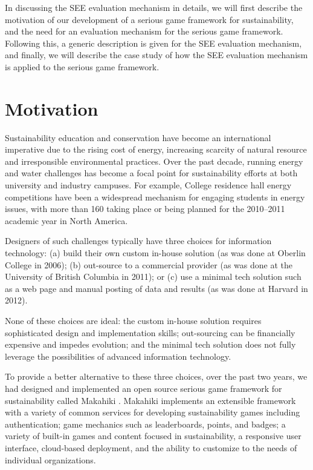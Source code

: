 \documentclass{sigchi}
\begin{document}
In discussing the SEE evaluation mechanism in details, we will first describe the motivation of our development of a serious game framework for sustainability, and the need for an evaluation mechanism for the serious game framework. Following this, a generic description is given for the SEE evaluation mechanism, and finally, we will describe the case study of how the SEE evaluation mechanism is applied to the serious game framework.

\section{Motivation}

Sustainability education and conservation have become an international imperative due to the rising cost of energy, increasing scarcity of natural resource and irresponsible environmental practices. Over the past decade, running energy and water challenges has become a focal point for sustainability efforts at both university and industry campuses. For example, College residence hall energy competitions have been a widespread mechanism for engaging students in energy issues, with more than 160 taking place or being planned for the 2010--2011 academic year in North America\cite{Hodge2010}.

Designers of such challenges typically have three choices for information technology: (a) build their own custom in-house solution (as was done at Oberlin College in 2006\cite{petersen-dorm-energy-reduction}); (b) out-source to a commercial provider (as was done at the University of British Columbia in 2011); or (c) use a minimal tech solution such as a web page and manual posting of data and results (as was done at Harvard in 2012).

None of these choices are ideal: the custom in-house solution requires sophisticated design and implementation skills; out-sourcing can be financially expensive and impedes evolution; and the minimal tech solution does not fully leverage the possibilities of advanced information technology.

To provide a better alternative to these three choices, over the past two years, we had designed and implemented an open source serious game framework for sustainability called Makahiki \cite{csdl2-12-06}. Makahiki implements an extensible framework with a variety of common services for developing sustainability games including authentication; game mechanics such as leaderboards, points, and badges; a variety of built-in games and content focused in sustainability, a responsive user interface, cloud-based deployment, and the ability to customize to the needs of individual organizations.
\end{document}
